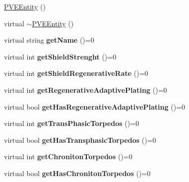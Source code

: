 \begin{DoxyCompactItemize}
\item 
\hyperlink{classPVEEntity_ab00e5efa6fb12a9661df9a1c74c72168}{PVEEntity} ()
\item 
virtual \hyperlink{classPVEEntity_aac5b1b2d4ecf705c32734907741d56d2}{$\sim$PVEEntity} ()
\item 
\hypertarget{classPVEEntity_abd5e859d332c2920f005ef8c97734dff}{
virtual string {\bfseries getName} ()=0}
\label{df/dde/classPVEEntity_abd5e859d332c2920f005ef8c97734dff}

\item 
\hypertarget{classPVEEntity_a352a032772da3a69481f382c85db0cf6}{
virtual int {\bfseries getShieldStrenght} ()=0}
\label{df/dde/classPVEEntity_a352a032772da3a69481f382c85db0cf6}

\item 
\hypertarget{classPVEEntity_a4652096367bb38b3635c39015b6be341}{
virtual int {\bfseries getShieldRegenerativeRate} ()=0}
\label{df/dde/classPVEEntity_a4652096367bb38b3635c39015b6be341}

\item 
\hypertarget{classPVEEntity_aa36eeaf1c2e0eabadd6d64e2a7ef4886}{
virtual int {\bfseries getRegenerativeAdaptivePlating} ()=0}
\label{df/dde/classPVEEntity_aa36eeaf1c2e0eabadd6d64e2a7ef4886}

\item 
\hypertarget{classPVEEntity_a411d1158d184f4912420fc49b6d03209}{
virtual bool {\bfseries getHasRegenerativeAdaptivePlating} ()=0}
\label{df/dde/classPVEEntity_a411d1158d184f4912420fc49b6d03209}

\item 
\hypertarget{classPVEEntity_a865254bdecac68ca01cb010c7ac22a03}{
virtual int {\bfseries getTransPhasicTorpedos} ()=0}
\label{df/dde/classPVEEntity_a865254bdecac68ca01cb010c7ac22a03}

\item 
\hypertarget{classPVEEntity_a95362dd29a50832c268f0a465fb0c3b7}{
virtual bool {\bfseries getHasTransphasicTorpedos} ()=0}
\label{df/dde/classPVEEntity_a95362dd29a50832c268f0a465fb0c3b7}

\item 
\hypertarget{classPVEEntity_a2231dfd422613018b41903197abe4098}{
virtual int {\bfseries getChronitonTorpedos} ()=0}
\label{df/dde/classPVEEntity_a2231dfd422613018b41903197abe4098}

\item 
\hypertarget{classPVEEntity_a34f008af67cfe98cf4db0f7e4e56aa8a}{
virtual bool {\bfseries getHasChronitonTorpedos} ()=0}
\label{df/dde/classPVEEntity_a34f008af67cfe98cf4db0f7e4e56aa8a}


\end{DoxyCompactItemize}

